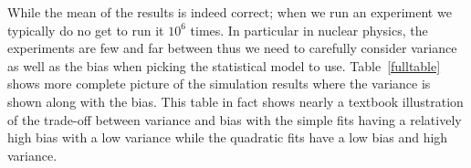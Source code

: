 \documentclass[10pt,aps,prc,twocolumn]{revtex4-1}
\begin{document}
While the mean of the results is indeed correct; when we run an experiment we typically do no get to run it $10^6$ times.
In particular in nuclear physics, the experiments are few and far between thus we need to carefully consider variance as
well as the bias when picking the statistical model to use.
%
%
%
%
Table~\ref{fulltable} shows more complete picture of the simulation results where the variance is shown along with the bias.
This table in fact shows nearly a textbook illustration of the trade-off between variance and bias with the simple fits
having a relatively high bias with a low variance while the quadratic fits have a low bias and high variance.
\end{document}
